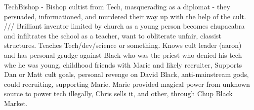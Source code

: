 \documentclass[char]{GL2020}
\begin{document}
\name{\cChupInventor{}}








TechBishop - Bishop cultist from Tech, masquerading as a diplomat - they persuaded, informationed, and murdered their way up with the help of the cult.  ///  Brilliant inventor limited by church as a young person becomes chupacabra and infiltrates the school as a teacher, want to obliterate unfair, classist structures.  Teaches Tech/dev/science or something.	Knows cult leader (aaron) and has personal grudge against Black who was the priest who denied his tech whe he was young, childhood friends with Marie and likely recruiter,  Supports Dan or Matt	cult goals, personal revenge on David Black, anti-mainstream gods, could recruiting, supporting Marie.  Marie provided magical power from unknown source to power tech illegally, Chris sells it, and other, through Chup Black Market.
\end{document}
